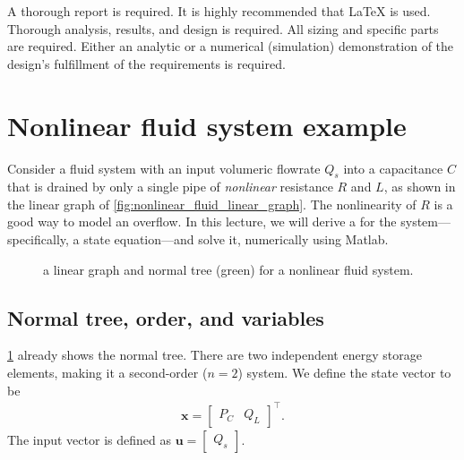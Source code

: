 \documentclass[dynamic_systems.tex]{subfiles}
\begin{document}
A thorough report is required.
It is highly recommended that LaTeX is used.
Thorough analysis, results, and design is required.
All sizing and specific parts are required.
Either an analytic or a numerical (simulation) demonstration of the design's fulfillment of the requirements is required.
\tags{}

\section{Nonlinear fluid system example}
\tags{}

Consider a fluid system with an input volumeric flowrate $Q_s$ into a capacitance $C$ that is drained by only a single pipe of \emph{nonlinear} resistance $R$ and $L$, as shown in the linear graph of \autoref{fig:nonlinear_fluid_linear_graph}.
The nonlinearity of $R$ is a good way to model an overflow.
In this lecture, we will derive a  for the system---specifically, a state equation---and solve it, numerically using Matlab.

\begin{figure}[b]
\centering
{}%
\caption{a linear graph and normal tree (green) for a nonlinear fluid system.}
\label{fig:nonlinear_fluid_linear_graph}
\end{figure}

\subsection{Normal tree, order, and variables}
\tags{}

\cref{fig:nonlinear_fluid_linear_graph} already shows the normal tree.
There are two independent energy storage elements, making it a second-order ($n=2$) system.
We define the state vector to be
\tags{}
\begin{align}
  \bm{x} = \begin{bmatrix}
    P_{C} &
    Q_{L}
  \end{bmatrix}^\top.
\end{align}
The input vector is defined as $\bm{u} = \begin{bmatrix} Q_s \end{bmatrix}$.
\end{document}
